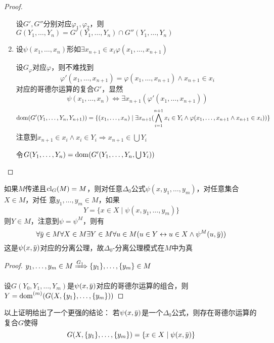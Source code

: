 \documentclass[11pt]{article}
\begin{document}
\begin{proof}
\begin{enumerate}
设\(G',G''\)分别对应\(\varphi_1,\varphi_2\)，则\(G(Y_1,\dots,Y_n)=G'(Y_1,\dots,Y_n)\cap G''(Y_1,\dots,Y_n)\)
\item 设\(\psi(x_1,\dots,x_n)\)形如\(\exists x_{n+1}\in x_i\varphi(x_1,\dots,x_{n+1})\)

设\(G_\varphi\)对应\(\varphi\)，则不难找到
\begin{equation*}
\varphi'(x_1,\dots,x_{n+1})=\varphi(x_1,\dots,x_{n+1})\wedge x_{n+1}\in x_i
\end{equation*}
对应的哥德尔运算的复合\(G'\)，显然
\begin{equation*}
\psi(x_1,\dots,x_n)\Leftrightarrow\exists x_{n+1}(\varphi'(x_1,\dots,x_{n+1}))
\end{equation*}
\begin{equation*}
\operatorname{dom}(G'(Y_1,\dots,Y_n,Y_{n+1}))=\{(x_1,\dots,x_n)\mid\exists x_{n+1}(\bigwedge_{i=1}^{n+1}x_i\in Y_i\wedge\varphi(x_1,\dots,x_{n+1}\wedge x_{n+1}\in x_i))\}
\end{equation*}
注意到\(x_{n+1}\in x_i\wedge x_i\in Y_i\Rightarrow x_{n+1}\in\bigcup Y_i\)

令\(G(Y_1,\dots,Y_n)=\operatorname{dom}(G'(Y_1,\dots,Y_n,\bigcup Y_i))\)
\end{enumerate}
\end{proof}

\begin{corollary}[]
如果\(M\)传递且\(\operatorname{\text{cl}}_G(M)=M\)，则对任意\(\Delta_0\)公式\(\psi(x,y_1,\dots,y_m)\)，对任意集合\(X\in M\)，对任
意\(y_1,\dots,y_m\in M\)，如果
\begin{equation*}
Y=\{x\in X\mid\psi(x,y_1,\dots,y_m)\}
\end{equation*}
则\(Y\in M\)，注意到\(\psi=\psi^M\)，则有
\begin{equation*}
\forall\bary\in M\forall X\in M\exists Y\in M\forall u\in M(u\in Y\leftrightarrow u\in X\wedge\psi^M(u,\bary))
\end{equation*}
这是\(\psi(x,\bary)\)对应的分离公理，故\(\Delta_0\)-分离公理模式在\(M\)中为真
\end{corollary}

\begin{proof}
\(y_1,\dots,y_m\in M\xRightarrow{G_1}\{y_1\},\dots,\{y_m\}\in M\)

设\(G(Y_0,Y_1,\dots,Y_m)\)是\(\psi(x,\bary)\)对应的哥德尔运算的组合，则
\(Y=\operatorname{dom}^{(m)}(G(X,\{y_1\},\dots,\{y_m\}))\)
\end{proof}

\begin{remark}
以上证明给出了一个更强的结论：
若\(\psi(x,\bary)\)是一个\(\Delta_0\)公式，则存在哥德尔运算的复合\(G\)使得
\begin{equation*}
G(X,\{y_1\},\dots,\{y_m\})=\{x\in X\mid\psi(x,\bary)\}
\end{equation*}
\end{remark}
\end{document}
